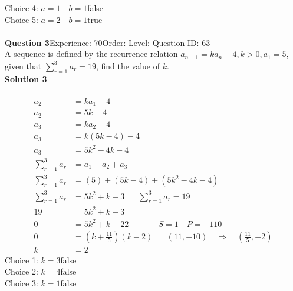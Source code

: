 \documentclass{article}
\begin{document}
Choice 4: \hspace{20pt}$a=1\quad b=1$\hspace{20pt}false\\
Choice 5: \hspace{20pt}$a=2\quad b=1$\hspace{20pt}true\\
\\[4pt]
\noindent\textbf{Question 3}\hspace{20pt}Experience: 70\hspace{20pt}Order: \hspace{20pt}Level: \hspace{20pt}Question-ID: 63\\[2pt]
A sequence is defined by the recurrence relation $a_{n+1}=ka_n-4,k>0, a_1=5$, given that $\displaystyle\sum_{r=1}^{3} a_r=19$, find the value of $k$.\\[4pt]
\noindent\textbf{Solution 3}\\[2pt]
\\[-35pt]\begin{align*}
a_2&=ka_1-4\\[2pt]
a_2&=5k-4\\[12pt]
a_3&=ka_2-4\\[2pt]
a_3&=k(5k-4)-4\\[2pt]
a_3&=5k^2-4k-4\\[12pt]
\displaystyle\sum_{r=1}^{3} a_r&=a_1+a_2+a_3\\[2pt]
\displaystyle\sum_{r=1}^{3} a_r&=(5)+(5k-4)+(5k^2-4k-4)\\[2pt]
\displaystyle\sum_{r=1}^{3} a_r&=5k^2+k-3\hspace{20pt}\displaystyle\sum_{r=1}^{3} a_r=19\\[2pt]
19&=5k^2+k-3\\[2pt]
0&=5k^2+k-22\hspace{43pt}S=1 \quad P=-110\\[2pt]
0&=\left(k+\displaystyle\frac{11}{5}\right)(k-2)\hspace{20pt}(11,-10)\quad \Rightarrow \quad \left(\displaystyle\frac{11}{5},-2\right)\\[2pt]
k&=2
\end{align*}
Choice 1: \hspace{20pt}$k=3$\hspace{20pt}false\\
Choice 2: \hspace{20pt}$k=4$\hspace{20pt}false\\
Choice 3: \hspace{20pt}$k=1$\hspace{20pt}false\\
\end{document}
